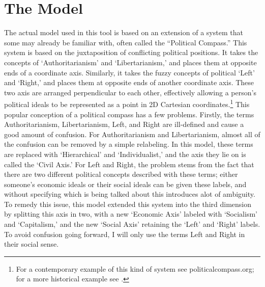 \documentclass[12pt]{article}
\begin{document}
\section{The Model} \label{TheModel}
\qquad The actual model used in this tool is based on an extension of a system that some may already be familiar with, often called the ``Political Compass.'' This system is based on the juxtaposition of conflicting political positions. It takes the concepts of `Authoritarianism' and `Libertarianism,' and places them at opposite ends of a coordinate axis. Similarly, it takes the fuzzy concepts of political `Left' and `Right,' and places them at opposite ends of another coordinate axis. These two axis are arranged perpendicular to each other, effectively allowing a person's political ideals to be represented as a point in 2D Cartesian coordinates.\footnote{For a contemporary example of this kind of system see politicalcompass.org; for a more historical example see \cite{brysonmcdill}.} This popular conception of a political compass has a few problems. Firstly, the terms Authoritarianism, Libertarianism, Left, and Right are ill-defined and cause a good amount of confusion. For Authoritarianism and Libertarianism, almost all of the confusion can be removed by a simple relabeling. In this model, these terms are replaced with `Hierarchical' and `Individualist,' and the axis they lie on is called the `Civil Axis.' For Left and Right, the problem stems from the fact that there are two different political concepts described with these terms; either someone's economic ideals or their social ideals can be given these labels, and without specifying which is being talked about this introduces alot of ambiguity. To remedy this issue, this model extended this system into the third dimension by splitting this axis in two, with a new `Economic Axis' labeled with `Socialism' and `Capitalism,' and the new `Social Axis' retaining the `Left' and `Right' labels. To avoid confusion going forward, I will only use the terms Left and Right in their social sense. \\
\end{document}

